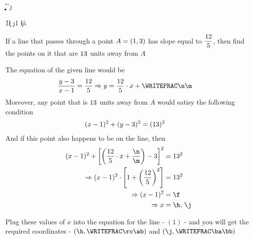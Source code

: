 



\FRACMULT\vbthree\vbfour{}\p\q
\FRACMINUS{}\p\q\n\m
\SQUARE\vbfour\a
\SQUARE\vbfive\b
\SQUARE\vbthree\c
\MULTIPLY\a\b\d
\ADD\a\c\e
\DIVIDE\d\e\f
\SQUAREROOT\f\g
\SUBTRACT\vbone\g\h
\ADD\vbone\g\j

\FRACMULT\vbthree\vbfour\h{1}\k\l
\FRACMULT\vbthree\vbfour\j{1}\y\z
\FRACADD\k\l\n\m\aa\ab
\FRACADD\y\z\n\m\ba\bb

\renewcommand{\vbsix}{\dfrac{\vbthree}{\vbfour}}

\question[4] If a line that passes through a point $A = (1, 3)$ has slope equal to $\dfrac{12}{5}$, then 
find the points on it that are $13$ units away from $A$

\watchout

\ifprintanswers
\fi 

\begin{solution}[\halfpage]
	The equation of the given line would be 
	\begin{align}
		\dfrac{y-\vbtwo}{x-\vbone} &= \vbsix \Rightarrow y = \dfrac\vbthree\vbfour\cdot x + \WRITEFRAC\n\m
	\end{align}
	Moreover, any point that is $13$ units away from $A$ would satisy 
	the following condition 
	\begin{align}
		(x - 1)^2 + (y-3)^2 &= (13)^2 
	\end{align}
	And if this point also happens to be on the line, then 
	\begin{align}
		(x-\vbone)^2 + \left[ \left( \vbsix\cdot x + \dfrac\n\m\right) - \vbtwo \right]^2 &= \vbfive^2 \\
		\Rightarrow (x - \vbone)^2\cdot\left[ 1 + \left( \vbsix \right)^2\right] &= \vbfive^2 \\
    \Rightarrow (x - \vbone)^2 &= \f  \\ 
    \Rightarrow x &=  \h,\,\j
	\end{align}
	
    
  Plug these values of $x$ into the equation for the line - $(1)$ - and you will 
  get the required coordinates -  $(\h,\WRITEFRAC\aa\ab)$ and $(\j,\WRITEFRAC\ba\bb)$
\end{solution}


